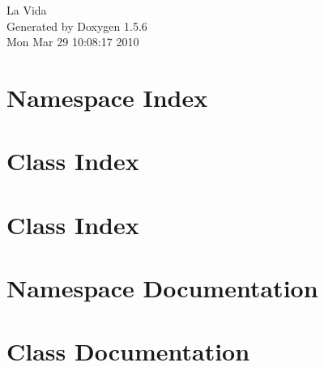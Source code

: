 \documentclass[a4paper]{book}
\begin{document}
\begin{titlepage}
\vspace*{7cm}
\begin{center}
{\Large La Vida }\\
\vspace*{1cm}
{\large Generated by Doxygen 1.5.6}\\
\vspace*{0.5cm}
{\small Mon Mar 29 10:08:17 2010}\\
\end{center}
\end{titlepage}
\clearemptydoublepage
{}
\tableofcontents
\clearemptydoublepage
{}
\chapter{Namespace Index}

\chapter{Class Index}

\chapter{Class Index}

\chapter{Namespace Documentation}





















\chapter{Class Documentation}















\printindex
\end{document}

